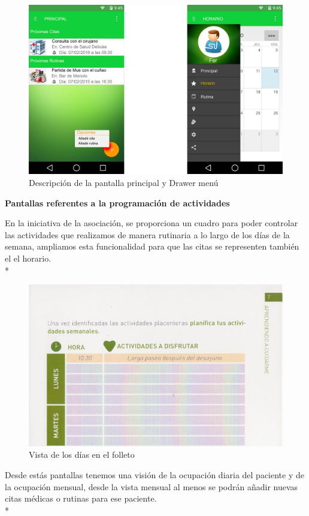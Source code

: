 \documentclass[../pfc.tex]{subfiles}
\begin{document}
		
		\begin{figure}[H]
			\centering
			\includegraphics[width=0.8\linewidth]{../images/principal_2}
			\caption[Drawer menú y Pantalla principal]{Descripción de la pantalla principal y Drawer menú}
			\label{fig:principal}
		\end{figure}
		
		
		\textbf{Pantallas referentes a la programación de actividades}
		
		En la iniciativa de la asociación, se proporciona un cuadro para poder controlar las actividades que realizamos de manera rutinaria a lo largo de los días de la semana, ampliamos esta funcionalidad para que las citas se representen también el el horario.\\*
		
			\begin{figure}[H]
				\centering
				\includegraphics[width=0.7\linewidth]{../folleto/007_corto}
				\caption{Vista de los días en el folleto}
				\label{fig:horario_corto}
			\end{figure}
		
		
		Desde estás pantallas tenemos una visión de la ocupación diaria del paciente y de la ocupación mensual, desde la vista mensual al menos se podrán añadir nuevas citas médicas o rutinas para ese paciente.\\*
\end{document}

